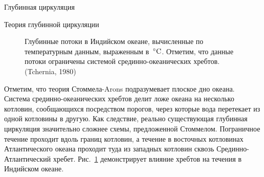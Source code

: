 \begin{chapter}{Глубинная циркуляция}
\begin{section}{Теория глубинной циркуляции}
\begin{figure}[t!]
\begin{center}
\caption{Глубинные потоки в Индийском океане, вычисленные по температурным
данным, выраженным в~${}^\circ\mbox{C}$. Отметим, что данные потоки ограничены
системой срединно-океанических хребтов. (Tchernia, 1980)}
\end{center}
\label{fig:deepindian}
\end{figure}
%

Отметим, что теория Стоммела-Arons подразумевает плоское дно океана. 
Система срединно-океанических хребтов делит ложе океана на несколько 
котловин, сообщающихся посредством порогов, через которые вода перетекает
из одной котловины в другую. Как следствие, реально существующая глубинная
циркуляция значительно сложнее схемы, предложенной Стоммелом.
Пограничное течение проходит вдоль границ котловин, а течение в восточных 
котловинах Атлантического океана проходит туда из западных котловин сквозь 
Срединно-Атлантический хребет.
Рис.~\ref{fig:deepindian} демонстрирует влияние хребтов на течения в 
Индийском океане.
%


\end{section}
\end{chapter}
